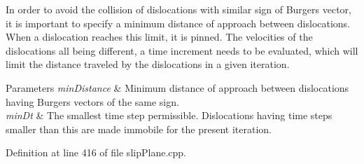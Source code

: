 In order to avoid the collision of dislocations with similar sign of Burgers vector, it is important to specify a minimum distance of approach between dislocations. When a dislocation reaches this limit, it is pinned. The velocities of the dislocations all being different, a time increment needs to be evaluated, which will limit the distance traveled by the dislocations in a given iteration. 
\begin{DoxyParams}{Parameters}
{\em min\-Distance} & Minimum distance of approach between dislocations having Burgers vectors of the same sign. \\
\hline
{\em min\-Dt} & The smallest time step permissible. Dislocations having time steps smaller than this are made immobile for the present iteration. \\
\hline
\end{DoxyParams}


Definition at line 416 of file slip\-Plane.\-cpp.


